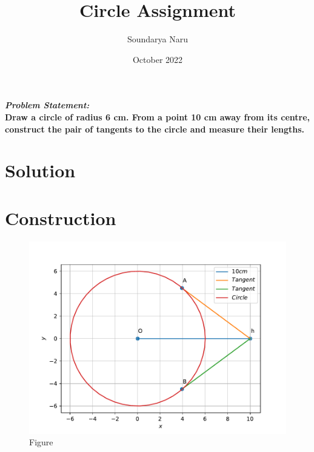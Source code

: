 \documentclass[journal,10pt,twocolumn]{article}
\title{\textbf{Circle Assignment}}
\author{Soundarya Naru}
\date{October 2022}
\begin{document}
\maketitle
\paragraph{\textit{Problem Statement:} \\ Draw a circle of radius 6 cm.
From a point 10 cm away from its centre, construct the pair of tangents to the circle and measure their lengths.}

\section*{\large Solution}

\section*{\large Construction}

\begin{figure}[h]
\centering
\includegraphics[width=1\columnwidth]{circle1.pdf}
\caption{Figure}
\label{fig:triangle}
\end{figure}
\end{document}
